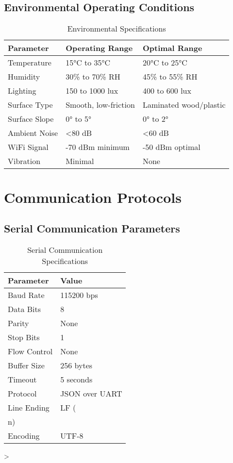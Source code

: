 \subsection{Environmental Operating Conditions}

\begin{table}[H]
\centering
\caption{Environmental Specifications}
\begin{tabular}{|l|l|l|}
\hline
\textbf{Parameter} & \textbf{Operating Range} & \textbf{Optimal Range} \\
\hline
Temperature & 15°C to 35°C & 20°C to 25°C \\
Humidity & 30\% to 70\% RH & 45\% to 55\% RH \\
Lighting & 150 to 1000 lux & 400 to 600 lux \\
Surface Type & Smooth, low-friction & Laminated wood/plastic \\
Surface Slope & 0° to 5° & 0° to 2° \\
Ambient Noise & <80 dB & <60 dB \\
WiFi Signal & -70 dBm minimum & -50 dBm optimal \\
Vibration & Minimal & None \\
\hline
\end{tabular}
\label{tab:environment}
\end{table}

\section{Communication Protocols}

\subsection{Serial Communication Parameters}

\begin{table}[H]
\centering
\caption{Serial Communication Specifications}
\begin{tabular}{|l|l|}
\hline
\textbf{Parameter} & \textbf{Value} \\
\hline
Baud Rate & 115200 bps \\
Data Bits & 8 \\
Parity & None \\
Stop Bits & 1 \\
Flow Control & None \\
Buffer Size & 256 bytes \\
Timeout & 5 seconds \\
Protocol & JSON over UART \\
Line Ending & LF (\\n) \\
Encoding & UTF-8 \\
\hline
\end{tabular}
\label{tab:serial}
\end{table}>

